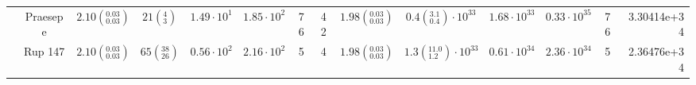 \begin{tabular}{lccccccccccccr}
          & Praesepe &  $2.10\left(^{0.03}_{0.03}\right)$ &          $21\left(^{4}_{3}\right)$ &    $1.49\cdot 10^{1}$ &    $1.85\cdot 10^{2}$ &                 76 &                 42 &  $1.98\left(^{0.03}_{0.03}\right)$ &   $0.4\left(^{3.1}_{0.4}\right)\cdot 10^{33}$ &       $1.68\cdot 10^{33}$ &       $0.33\cdot 10^{35}$ &                   76 &          3.30414e+34 \\
          & Rup 147 &  $2.10\left(^{0.03}_{0.03}\right)$ &        $65\left(^{38}_{26}\right)$ &    $0.56\cdot 10^{2}$ &    $2.16\cdot 10^{2}$ &                  5 &                  4 &  $1.98\left(^{0.03}_{0.03}\right)$ &  $1.3\left(^{11.0}_{1.2}\right)\cdot 10^{33}$ &       $0.61\cdot 10^{34}$ &       $2.36\cdot 10^{34}$ &                    5 &          2.36476e+34 \\
\hline

\end{tabular}
